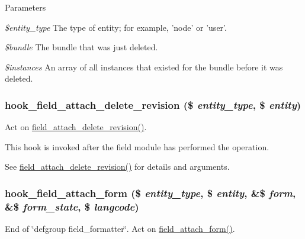\begin{DoxyParams}{Parameters}
\item[{\em \$entity\_\-type}]The type of entity; for example, 'node' or 'user'. \item[{\em \$bundle}]The bundle that was just deleted. \item[{\em \$instances}]An array of all instances that existed for the bundle before it was deleted. \end{DoxyParams}
\hypertarget{group__field__attach_ga99f52991e1d235aa3c57d21778b4b595}{
\subsubsection[{hook\_\-field\_\-attach\_\-delete\_\-revision}]{\setlength{\rightskip}{0pt plus 5cm}hook\_\-field\_\-attach\_\-delete\_\-revision (\$ {\em entity\_\-type}, \/  \$ {\em entity})}}
\label{group__field__attach_ga99f52991e1d235aa3c57d21778b4b595}
Act on \hyperlink{group__field__attach_gaa9eae65e6d9f1996cb27a55ba25b56e9}{field\_\-attach\_\-delete\_\-revision()}.

This hook is invoked after the field module has performed the operation.

See \hyperlink{group__field__attach_gaa9eae65e6d9f1996cb27a55ba25b56e9}{field\_\-attach\_\-delete\_\-revision()} for details and arguments. \hypertarget{group__field__attach_ga34b24a5a84763be5c6b9d214b1e81d93}{
\subsubsection[{hook\_\-field\_\-attach\_\-form}]{\setlength{\rightskip}{0pt plus 5cm}hook\_\-field\_\-attach\_\-form (\$ {\em entity\_\-type}, \/  \$ {\em entity}, \/  \&\$ {\em form}, \/  \&\$ {\em form\_\-state}, \/  \$ {\em langcode})}}
\label{group__field__attach_ga34b24a5a84763be5c6b9d214b1e81d93}
End of \char`\"{}defgroup field\_\-formatter\char`\"{}. Act on \hyperlink{group__field__attach_gac5bd0213dae78f7c1b3235f3acdde2c6}{field\_\-attach\_\-form()}.

